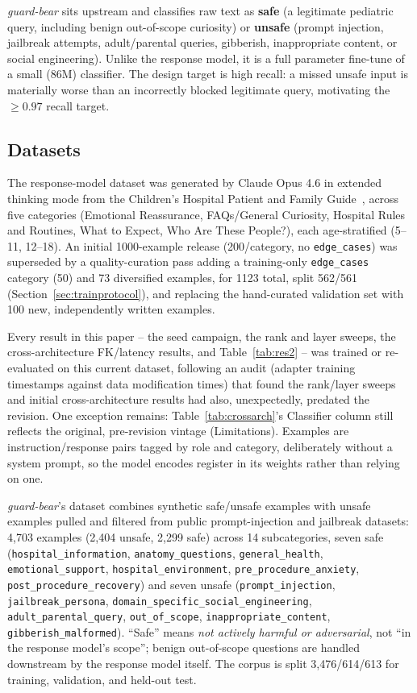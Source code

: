 \documentclass[pdflatex,sn-mathphys-num]{sn-jnl}%
\begin{document}
\textit{guard-bear} sits upstream and classifies raw text as \textbf{safe} (a legitimate pediatric query, including benign out-of-scope curiosity) or \textbf{unsafe} (prompt injection, jailbreak attempts, adult/parental queries, gibberish, inappropriate content, or social engineering). Unlike the response model, it is a full parameter fine-tune of a small (86M) classifier. The design target is high recall: a missed unsafe input is materially worse than an incorrectly blocked legitimate query, motivating the $\geq 0.97$ recall target.

\subsection{Datasets}\label{subsec:responsedataset}

The response-model dataset was generated by Claude Opus 4.6 in extended thinking mode from the Children's Hospital Patient and Family Guide~\cite{hospitalguide}, across five categories (Emotional Reassurance, FAQs/General Curiosity, Hospital Rules and Routines, What to Expect, Who Are These People?), each age-stratified (5--11, 12--18). An initial 1000-example release (200/category, no \texttt{edge\_cases}) was superseded by a quality-curation pass adding a training-only \texttt{edge\_cases} category (50) and 73 diversified examples, for 1123 total, split 562/561 (Section~\ref{sec:trainprotocol}), and replacing the hand-curated validation set with 100 new, independently written examples.

Every result in this paper -- the seed campaign, the rank and layer sweeps, the cross-architecture FK/latency results, and Table~\ref{tab:res2} -- was trained or re-evaluated on this current dataset, following an audit (adapter training timestamps against data modification times) that found the rank/layer sweeps and initial cross-architecture results had also, unexpectedly, predated the revision. One exception remains: Table~\ref{tab:crossarch}'s Classifier column still reflects the original, pre-revision vintage (Limitations). Examples are instruction/response pairs tagged by role and category, deliberately without a system prompt, so the model encodes register in its weights rather than relying on one.

\textit{guard-bear}'s dataset combines synthetic safe/unsafe examples with unsafe examples pulled and filtered from public prompt-injection and jailbreak datasets: 4{,}703 examples (2{,}404 unsafe, 2{,}299 safe) across 14 subcategories, seven safe (\texttt{hospital\_information}, \texttt{anatomy\_questions}, \texttt{general\_health}, \texttt{emotional\_support}, \texttt{hospital\_environment}, \texttt{pre\_procedure\_anxiety}, \texttt{post\_procedure\_recovery}) and seven unsafe (\texttt{prompt\_injection}, \texttt{jailbreak\_persona}, \texttt{domain\_specific\_social\_engineering}, \texttt{adult\_parental\_query}, \texttt{out\_of\_scope}, \texttt{inappropriate\_content}, \texttt{gibberish\_malformed}). ``Safe'' means \textit{not actively harmful or adversarial}, not ``in the response model's scope''; benign out-of-scope questions are handled downstream by the response model itself. The corpus is split 3{,}476/614/613 for training, validation, and held-out test.
\end{document}

